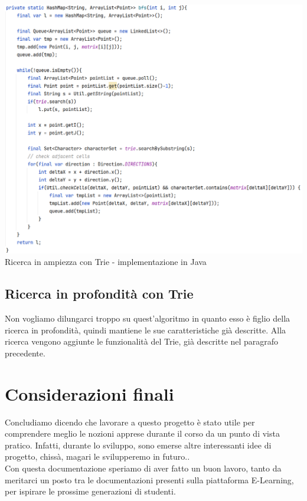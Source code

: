 \documentclass[10pt,a4paper]{article}
\begin{document}
	\begin{center}
		\includegraphics[scale=0.55]{bfsTrie}
		Ricerca in ampiezza con Trie - implementazione in Java
	\end{center}
	\subsection{Ricerca in profondità con Trie}
	Non vogliamo dilungarci troppo su quest'algoritmo in quanto esso è figlio della ricerca in profondità, quindi mantiene le sue caratteristiche già descritte. Alla ricerca vengono aggiunte le funzionalità del Trie, già descritte nel paragrafo precedente.
	\section{Considerazioni finali}
	Concludiamo dicendo che lavorare a questo progetto è stato utile per comprendere meglio le nozioni apprese durante il corso da un punto di vista pratico. Infatti, durante lo sviluppo, sono emerse altre interessanti idee di progetto, chissà, magari le svilupperemo in futuro..\\
	Con questa documentazione speriamo di aver fatto un buon lavoro, tanto da meritarci un posto tra le documentazioni presenti sulla piattaforma E-Learning, per ispirare le prossime generazioni di studenti.
\end{document}
